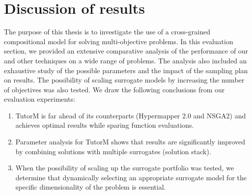 \section{Discussion of results}

The purpose of this thesis is to investigate the use of a cross-grained compositional model for solving multi-objective problems. In this evaluation section, we provided an extensive comparative analysis of the performance of our and other techniques on a wide range of problems. The analysis also included an exhaustive study of the possible parameters and the impact of the sampling plan on results. The possibility of scaling surrogate models by increasing the number of objectives was also tested. We draw the following conclusions from our evaluation experiments:
\begin{enumerate}
    \item TutorM is far ahead of its counterparts (Hypermapper 2.0 and NSGA2) and achieves optimal results while sparing function evaluations. 
    \item Parameter analysis for TutorM shows that results are significantly improved by combining solutions with multiple surrogates (solution stack).
    \item When the possibility of scaling up the surrogate portfolio was tested, we determine that dynamically selecting an appropriate surrogate model for the specific dimensionality of the problem is essential.
\end{enumerate}